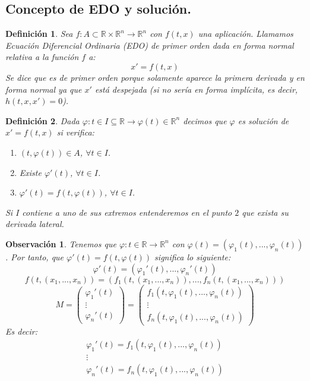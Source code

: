 \documentclass{article}
\theoremstyle{theorem-style}  %
\theoremstyle{definition-style}
\newtheorem{definition}{Definición}[section]
\newtheorem*{observation}{Observación} %
\theoremstyle{example-style}
\begin{document}
\subsection{Concepto de EDO y solución.}
\begin{definition}
	Sea $f: A \subset \mathbb{R} \times \mathbb{R}^n \longrightarrow \mathbb{R}^n$ con $f(t, x)$ una aplicación. Llamamos \emph{Ecuación Diferencial Ordinaria} (EDO) de primer orden dada en forma normal relativa a la función $f$ a: 
	\[ x' = f(t, x) \]
	Se dice que es de primer orden porque solamente aparece la primera derivada y en forma normal ya que $x'$ está despejada (si no sería en forma implícita, es decir, $h(t, x, x')=0$).
\end{definition}

\begin{definition}
	Dada $\varphi: t \in I \subseteq \mathbb{R} \longrightarrow \varphi (t) \in \mathbb{R}^n$ decimos que $\varphi$ es \emph{solución} de $x'=f(t, x)$ si verifica:
	\begin{enumerate}[\quad i)]
		\item $(t, \varphi (t)) \in A$, $\forall t \in I$.
		\item Existe $ \varphi' (t)$, $\forall t \in I$.
		\item $\varphi'(t)=f(t, \varphi(t))$,  $\forall t \in I$.
	\end{enumerate}
	Si $I$ contiene a uno de sus extremos entenderemos en el punto $2$ que exista su derivada lateral.
\end{definition}
\begin{observation}
	Tenemos que $\varphi: t \in \mathbb{R} \longrightarrow \mathbb{R}^n$ con $\varphi (t) = (\varphi_1 (t), ..., \varphi_n (t))$. Por tanto, que $\varphi' (t) = f(t, \varphi (t))$ significa lo siguiente:
	\[\varphi' (t) = (\varphi_1' (t), ..., \varphi_n' (t))\] 
	\[f(t, (x_1, ..., x_n)) = (f_1(t, (x_1, ..., x_n)), ..., f_n(t, (x_1, ..., x_n))) \]
	\[
	M=
	\left({\begin{array}{cc}
		\varphi_1' (t) \\
		\vdots \\
		\varphi_n' (t)
		\end{array} } \right)
	=
	\left({\begin{array}{cc}
		f_1(t, \varphi_1 (t), ..., \varphi_n (t)) \\
		\vdots \\
		f_n(t, \varphi_1 (t), ..., \varphi_n (t))
		\end{array} } \right)
	\]
	Es decir:
	\[\left . {\begin{array}{cc}
		\varphi_1' (t) = f_1(t, \varphi_1 (t), ..., \varphi_n (t)) \\
		\vdots \\
		\varphi_n' (t) = f_n(t, \varphi_1 (t), ..., \varphi_n (t))
		\end{array} } \right. \]
\end{observation}
\end{document}

